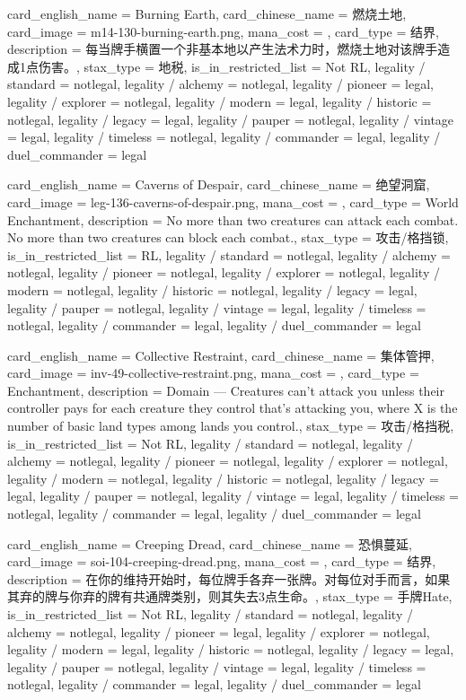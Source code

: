 \documentclass[lang = cn, color = black, 10pt]{AllThatStax}
\begin{document}
\card
{
	card_english_name = {Burning Earth},
	card_chinese_name = {燃烧土地},
	card_image = m14-130-burning-earth.png,
	mana_cost = ,
	card_type = 结界,
	description = {每当牌手横置一个非基本地以产生法术力时，燃烧土地对该牌手造成1点伤害。},
	stax_type = 地税,
	is_in_restricted_list = Not RL,
	legality / standard = notlegal,
	legality / alchemy = notlegal,
	legality / pioneer = legal,
	legality / explorer = notlegal,
	legality / modern = legal,
	legality / historic = notlegal,
	legality / legacy = legal,
	legality / pauper = notlegal,
	legality / vintage = legal,
	legality / timeless = notlegal,
	legality / commander = legal,
	legality / duel_commander = legal
}

\card
{
	card_english_name = {Caverns of Despair},
	card_chinese_name = {绝望洞窟},
	card_image = leg-136-caverns-of-despair.png,
	mana_cost = ,
	card_type = World Enchantment,
	description = {No more than two creatures can attack each combat.\\
		No more than two creatures can block each combat.},
	stax_type = 攻击/格挡锁,
	is_in_restricted_list = RL,
	legality / standard = notlegal,
	legality / alchemy = notlegal,
	legality / pioneer = notlegal,
	legality / explorer = notlegal,
	legality / modern = notlegal,
	legality / historic = notlegal,
	legality / legacy = legal,
	legality / pauper = notlegal,
	legality / vintage = legal,
	legality / timeless = notlegal,
	legality / commander = legal,
	legality / duel_commander = legal
}

\card
{
	card_english_name = {Collective Restraint},
	card_chinese_name = {集体管押},
	card_image = inv-49-collective-restraint.png,
	mana_cost = ,
	card_type = Enchantment,
	description = {Domain — Creatures can't attack you unless their controller pays  for each creature they control that's attacking you, where X is the number of basic land types among lands you control.},
	stax_type = 攻击/格挡税,
	is_in_restricted_list = Not RL,
	legality / standard = notlegal,
	legality / alchemy = notlegal,
	legality / pioneer = notlegal,
	legality / explorer = notlegal,
	legality / modern = notlegal,
	legality / historic = notlegal,
	legality / legacy = legal,
	legality / pauper = notlegal,
	legality / vintage = legal,
	legality / timeless = notlegal,
	legality / commander = legal,
	legality / duel_commander = legal
}

\card
{
	card_english_name = {Creeping Dread},
	card_chinese_name = {恐惧蔓延},
	card_image = soi-104-creeping-dread.png,
	mana_cost = ,
	card_type = 结界,
	description = {在你的维持开始时，每位牌手各弃一张牌。对每位对手而言，如果其弃的牌与你弃的牌有共通牌类别，则其失去3点生命。},
	stax_type = 手牌Hate,
	is_in_restricted_list = Not RL,
	legality / standard = notlegal,
	legality / alchemy = notlegal,
	legality / pioneer = legal,
	legality / explorer = notlegal,
	legality / modern = legal,
	legality / historic = notlegal,
	legality / legacy = legal,
	legality / pauper = notlegal,
	legality / vintage = legal,
	legality / timeless = notlegal,
	legality / commander = legal,
	legality / duel_commander = legal
}
\end{document}

